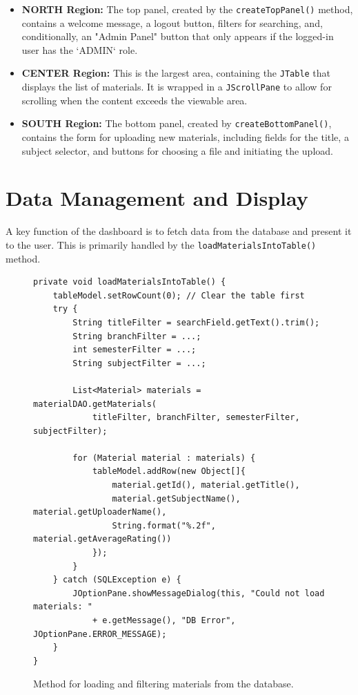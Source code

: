 \documentclass[12pt, a4paper]{report}
\begin{document}
\begin{itemize}
    \item \textbf{NORTH Region:} The top panel, created by the \texttt{createTopPanel()} method, contains a welcome message, a logout button, filters for searching, and, conditionally, an "Admin Panel" button that only appears if the logged-in user has the `ADMIN` role.
    \item \textbf{CENTER Region:} This is the largest area, containing the \texttt{JTable} that displays the list of materials. It is wrapped in a \texttt{JScrollPane} to allow for scrolling when the content exceeds the viewable area.
    \item \textbf{SOUTH Region:} The bottom panel, created by \texttt{createBottomPanel()}, contains the form for uploading new materials, including fields for the title, a subject selector, and buttons for choosing a file and initiating the upload.
\end{itemize}

\section{Data Management and Display}
A key function of the dashboard is to fetch data from the database and present it to the user. This is primarily handled by the \texttt{loadMaterialsIntoTable()} method.

\begin{figure}[h!]
\begin{verbatim}
private void loadMaterialsIntoTable() {
    tableModel.setRowCount(0); // Clear the table first
    try {
        String titleFilter = searchField.getText().trim();
        String branchFilter = ...;
        int semesterFilter = ...;
        String subjectFilter = ...;

        List<Material> materials = materialDAO.getMaterials(
            titleFilter, branchFilter, semesterFilter, subjectFilter);
            
        for (Material material : materials) {
            tableModel.addRow(new Object[]{
                material.getId(), material.getTitle(), 
                material.getSubjectName(), material.getUploaderName(), 
                String.format("%.2f", material.getAverageRating())
            });
        }
    } catch (SQLException e) {
        JOptionPane.showMessageDialog(this, "Could not load materials: " 
            + e.getMessage(), "DB Error", JOptionPane.ERROR_MESSAGE);
    }
}
\end{verbatim}
\caption{Method for loading and filtering materials from the database.}
\label{fig:load_materials}
\end{figure}
\end{document}
